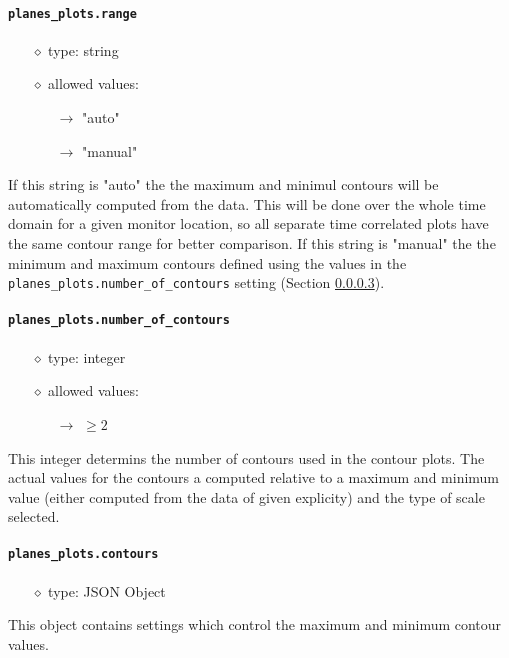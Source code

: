 \documentclass[]{article}
\def\code#1{\texttt{#1}}
\begin{document}
\paragraph{\code{planes\_plots.range}}
\begin{itemize}
    \item[$\diamond$] type: string 
    \item[$\diamond$] allowed values:
    \begin{itemize}
        \item[$\rightarrow$] "auto"
        \item[$\rightarrow$] "manual"
    \end{itemize}
\end{itemize}
If this string is "auto" the the maximum and minimul contours will be
automatically computed from the data. This will be done over the whole time
domain for a given monitor location, so all separate time correlated plots have
the same contour range for better comparison. If this string is "manual" the the
minimum and maximum contours defined using the values in the
\code{planes\_plots.number\_of\_contours} setting
(Section \ref{sec:numcontour}).

\paragraph{\code{planes\_plots.number\_of\_contours}}\label{sec:numcontour}
\begin{itemize}
    \item[$\diamond$] type: integer 
    \item[$\diamond$] allowed values:
    \begin{itemize}
        \item[$\rightarrow$] $\geq2$
    \end{itemize}
\end{itemize}
This integer determins the number of contours used in the contour plots. The
actual values for the contours a computed relative to a maximum and minimum
value (either computed from the data of given explicity) and the type of scale
selected.

\paragraph{\code{planes\_plots.contours}}\label{sec:numcontour}
\begin{itemize}
    \item[$\diamond$] type: JSON Object 
\end{itemize}
This object contains settings which control the maximum and minimum contour
values.
\end{document}
